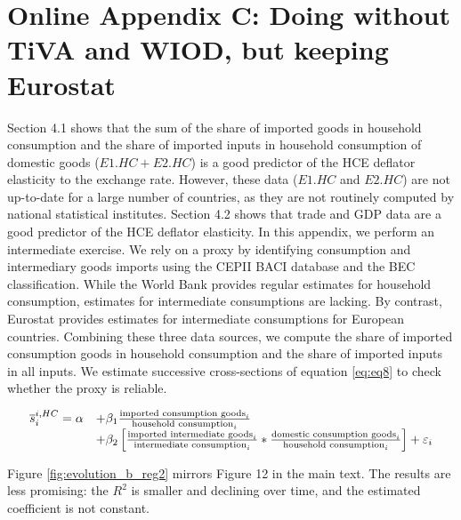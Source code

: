 \documentclass[12pt,a4paper]{article}
\begin{document}
\section*{Online Appendix C: Doing without TiVA and WIOD, but keeping Eurostat}
Section 4.1 shows that the sum of the share of imported goods in household consumption and the share of imported inputs in household consumption of domestic goods ($E1.HC + E2.HC$) is a good predictor of the HCE deflator elasticity to the exchange rate. 
However, these data ($E1.HC$ and $E2.HC$) are not up-to-date for a large number of countries, as they are not routinely computed by national statistical institutes. 
Section 4.2 shows that trade and GDP data are a good predictor of the HCE deflator elasticity.
In this appendix, we perform an intermediate exercise. We rely on a proxy by identifying consumption and intermediary goods imports using the CEPII BACI database and the BEC classification.
While the World Bank provides regular estimates for household consumption, estimates for intermediate consumptions are lacking. 
By contrast, Eurostat provides estimates for intermediate consumptions for European countries.
Combining these three data sources, we compute the share of imported consumption goods in household consumption and the share of imported inputs in all inputs. 
We estimate successive cross-sections of equation \ref{eq:eq8} to check whether the proxy is reliable. 

\begin{equation}
	\begin{array}{llll}
		\overline{s}_{i}^{i,HC}= \alpha &+  \beta_1  \frac{\textnormal{imported consumption goods}_i}{\textnormal{household consumption}_i} \\ & +  \beta_2  \left[    \frac{\textnormal{imported intermediate goods}_i}{\textnormal{intermediate consumption}_i}*\frac{\textnormal{domestic consumption goods}_i}{\textnormal{household consumption}_i}\right] +\varepsilon_i 
	\end{array} 
	\label{eq:eq8}
\end{equation}

Figure \ref{fig:evolution_b_reg2} mirrors Figure 12 in the main text. 
The results are less promising: the $R^2$ is smaller and declining over time, and the estimated coefficient is not constant.
\end{document}

